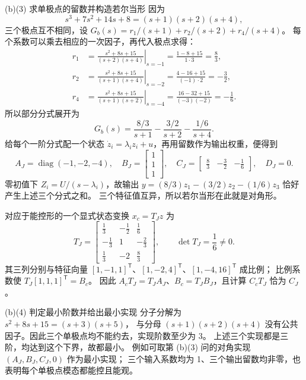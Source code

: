 \documentclass[11pt]{article}
\begin{document}
\begin{solution}
\begin{proofstep}{(b)(3) 求单极点的留数并构造若尔当形}
因为
\[
s^3+7s^2+14s+8=(s+1)(s+2)(s+4),
\]
三个极点互不相同，设 $G_b(s)=r_1/(s+1)+r_2/(s+2)+r_4/(s+4)$。
每个系数可以乘去相应的一次因子，再代入极点求得：
\begin{align*}
r_1&=\left.\frac{s^2+8s+15}{(s+2)(s+4)}\right|_{s=-1}
=\frac{1-8+15}{1\cdot3}=\frac83,\\
r_2&=\left.\frac{s^2+8s+15}{(s+1)(s+4)}\right|_{s=-2}
=\frac{4-16+15}{(-1)\cdot2}=-\frac32,\\
r_4&=\left.\frac{s^2+8s+15}{(s+1)(s+2)}\right|_{s=-4}
=\frac{16-32+15}{(-3)(-2)}=-\frac16.
\end{align*}
所以部分分式展开为
\[
G_b(s)=\frac{8/3}{s+1}-\frac{3/2}{s+2}-\frac{1/6}{s+4}.
\]
给每个一阶分式配一个状态 $\dot z_i=\lambda_i z_i+u$，再用留数作为输出权重，便得到
\[
A_J=\operatorname{diag}(-1,-2,-4),\quad
B_J=\begin{bmatrix}1\\1\\1\end{bmatrix},\quad
C_J=\begin{bmatrix}\frac83&-\frac32&-\frac16\end{bmatrix},\quad D_J=0.
\]
零初值下 $Z_i=U/(s-\lambda_i)$，故输出 $y=(8/3)z_1-(3/2)z_2-(1/6)z_3$
恰好产生上述三个分式之和。
三个特征值互异，所以若尔当形在此就是对角形。

对应于能控形的一个显式状态变换 $x_c=T_Jz$ 为
\[
T_J=\begin{bmatrix}
\frac13&-\frac12&\frac16\\[1mm]
-\frac13&1&-\frac23\\[1mm]
\frac13&-2&\frac83
\end{bmatrix},\qquad \det T_J=\frac16\ne0.
\]
其三列分别与特征向量 $[1,-1,1]^{\mathsf T}$、$[1,-2,4]^{\mathsf T}$、$[1,-4,16]^{\mathsf T}$ 成比例；
比例系数使 $T_J[1,1,1]^{\mathsf T}=B_c$。
因此 $A_cT_J=T_JA_J$、$B_c=T_JB_J$，且计算 $C_cT_J$ 恰为 $C_J$。
\end{proofstep}

\begin{proofstep}{(b)(4) 判定最小阶数并给出最小实现}
分子分解为 $s^2+8s+15=(s+3)(s+5)$，
与分母 $(s+1)(s+2)(s+4)$ 没有公共因子。因此三个单极点均不能约去，实现阶数至少为 3。
上述三个实现都是三阶，均达到这个下界，故都最小。
例如可取第 (b)(3) 问的对角实现 $(A_J,B_J,C_J,0)$ 作为最小实现；
三个输入系数均为 1、三个输出留数均非零，也表明每个单极点模态都能控且能观。
\end{proofstep}
\end{solution}
\end{document}
